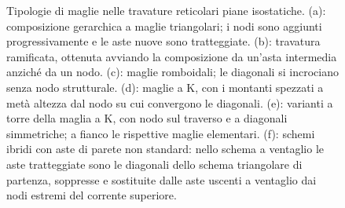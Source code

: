 \begin{figure}[!htbp]
{}
	\caption{Tipologie di maglie nelle travature reticolari
		piane isostatiche.
		(a): composizione gerarchica a maglie
		triangolari; i nodi sono aggiunti progressivamente
		e le aste nuove sono tratteggiate.
		(b): travatura ramificata, ottenuta
		avviando la composizione da un'asta intermedia
		anziché da un nodo.
		(c): maglie romboidali; le diagonali
		si incrociano senza nodo strutturale.
		(d): maglie a K, con i montanti spezzati
		a metà altezza dal nodo su cui convergono
		le diagonali.
		(e): varianti a torre della maglia a K,
		con nodo sul traverso e a diagonali simmetriche;
		a fianco le rispettive maglie elementari.
		(f): schemi ibridi con aste di parete
		non standard: nello schema a ventaglio le aste
		tratteggiate sono le diagonali dello schema
		triangolare di partenza, soppresse e sostituite
		dalle aste uscenti a ventaglio dai nodi estremi
		del corrente superiore.}
	\label{fig:tipologie_maglie}
\end{figure}
